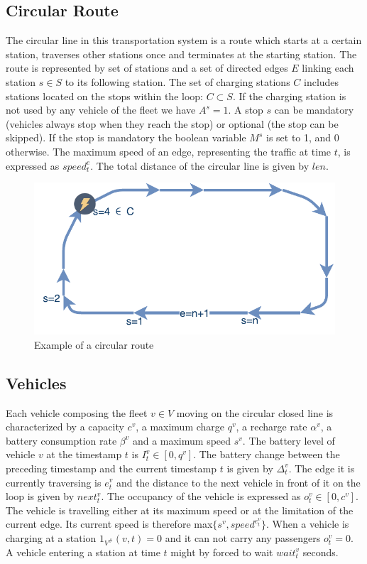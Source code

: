 \documentclass[12pt,a4paper]{article}
\begin{document}
\subsection{Circular Route}
The circular line in this transportation system is a route which starts at a certain station, traverses other stations once and terminates at the starting station. The route is represented by set of stations  and a set of directed edges $E$ linking each station $s \in S$ to its following station. The set of charging stations $C$ includes stations located on the stops within the loop: $C \subset S$. If the charging station is not used by any vehicle of the fleet we have $A^{s} = 1$. A stop $s$ can be mandatory (vehicles always stop when they reach the stop) or optional (the stop can be skipped). If the stop is mandatory the boolean variable $M^{s}$ is set to 1, and 0 otherwise. The maximum speed of an edge, representing the traffic at time $t$, is expressed as $speed^{e}_{t}$. The total distance of the circular line is given by $len$.

\begin{figure}[h] 
  \centering
\includegraphics[scale=0.7]{./images/loop.pdf}
\caption{Example of a circular route}
\label{fig:route}
\end{figure}

\subsection{Vehicles}\label{vehicles}
Each vehicle composing the fleet $v \in V$ moving on the circular closed line is characterized by a capacity $c^{v}$, a maximum charge $q^{v}$, a recharge rate $\alpha^{v}$, a battery consumption rate $\beta^{v}$ and a maximum speed $s^{v}$. The battery level of vehicle $v$ at the timestamp $t$ is $I^{v}_{t} \in [0, q^{v}]$. The battery change between the preceding timestamp and the current timestamp $t$ is given by $\Delta^{v}_{t}$. The edge it is currently traversing is $e^{v}_{t}$ and the distance to the next vehicle in front of it on the loop is given by $next^{v}_{t}$. The occupancy of the vehicle is expressed as $o^{v}_{t} \in [0, c^{v}]$. The vehicle is travelling either at its maximum speed or at the limitation of the current edge. Its current speed is therefore max$\{s^{v}, speed^{e^{v}_{t}}\}$. When a vehicle is charging at a station $1_{V^{\#}}(v,t) = 0$ and it can not carry any passengers $o^{v}_{t} = 0$. A vehicle entering a station at time $t$ might by forced to wait $wait^{v}_{t}$ seconds.
\end{document}
